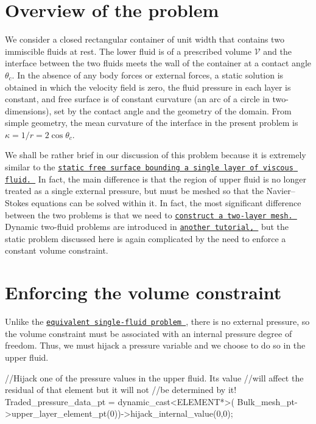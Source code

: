 \hypertarget{index_overview}{}\section{Overview of the problem}\label{index_overview}
We consider a closed rectangular container of unit width that contains two immiscible fluids at rest. The lower fluid is of a prescribed volume $ \mathcal{V} $ and the interface between the two fluids meets the wall of the container at a contact angle $ \theta_{c} $. In the absence of any body forces or external forces, a static solution is obtained in which the velocity field is zero, the fluid pressure in each layer is constant, and free surface is of constant curvature (an arc of a circle in two-\/dimensions), set by the contact angle and the geometry of the domain. From simple geometry, the mean curvature of the interface in the present problem is $ \kappa = 1/r = 2\cos\theta_{c} $.

We shall be rather brief in our discussion of this problem because it is extremely similar to the \href{../../static_single_layer/html/index.html}{\tt static free surface bounding a single layer of viscous fluid. } In fact, the main difference is that the region of upper fluid is no longer treated as a single external pressure, but must be meshed so that the Navier--Stokes equations can be solved within it. In fact, the most significant difference between the two problems is that we need to \href{#mesh}{\tt construct a two-\/layer mesh. } Dynamic two-\/fluid problems are introduced in \href{../../two_layer_interface/html/index.html}{\tt another tutorial, } but the static problem discussed here is again complicated by the need to enforce a constant volume constraint.\hypertarget{index_vol_const}{}\section{Enforcing the volume constraint}\label{index_vol_const}
Unlike the \href{../../static_single_layer/html/index.html}{\tt equivalent single-\/fluid problem }, there is no external pressure, so the volume constraint must be associated with an internal pressure degree of freedom. Thus, we must hijack a pressure variable and we choose to do so in the upper fluid.

 
\begin{DoxyCodeInclude}
 \textcolor{comment}{//Hijack one of the pressure values in the upper fluid. Its value}
 \textcolor{comment}{//will affect the residual of that element but it will not}
 \textcolor{comment}{//be determined by it!}
 Traded\_pressure\_data\_pt = \textcolor{keyword}{dynamic\_cast<}ELEMENT*\textcolor{keyword}{>}(
  Bulk\_mesh\_pt->upper\_layer\_element\_pt(0))->hijack\_internal\_value(0,0);

\end{DoxyCodeInclude}


